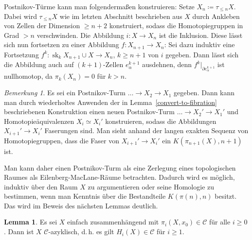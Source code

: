 \documentclass[11pt, a4paper, german]{article}
\theoremstyle{definition}
\newtheorem{lem}{Lemma}
\theoremstyle{remark}
\newtheorem*{bem}{Bemerkung}
\newcommand{\SC}{\mathcal{C}} %
\newcommand{\trunc}[2]{\tau_{#1} #2} %
\DeclareMathOperator{\sk}{sk} %
\renewcommand{\dh}{d.\,h.} %
\begin{document}
Postnikov-Türme kann man folgendermaßen konstruieren:
Setze $X_n \coloneqq \trunc{\leq n}{X}$.
Dabei wird $\trunc{\leq n}{X}$ wie im letzten Abschnitt beschrieben aus $X$ durch Ankleben von Zellen der Dimension $\geq n+2$ konstruiert, sodass die Homotopiegruppen in Grad $> n$ verschwinden.
Die Abbildung $i : X \to X_n$ ist die Inklusion.
Diese lässt sich nun fortsetzen zu einer Abbildung $f : X_{n+1} \to X_n$:
Sei dazu induktiv eine Fortsetzung $f^k : \sk_k X_{n+1} \cup X \to X_n$, $k \geq n+1$ von $i$ gegeben.
Dann lässt sich die Abbildung auch auf $(k{+}1)$-Zellen $e^{k+1}_\alpha$ ausdehnen, denn $f^k|_{\partial e^{k+1}_\alpha}$ ist nullhomotop, da $\pi_k(X_n) = 0$ für $k > n$.

\begin{bem}
  Es sei ein Postnikov-Turm $\ldots \to X_2 \to X_1$ gegeben.
  Dann kann man durch wiederholtes Anwenden der in Lemma~\ref{convert-to-fibration} beschriebenen Konstruktion einen neuen Postnikov-Turm $\ldots \to X_2' \to X_1'$ und Homotopieäquivalenzen $X_i \simeq X_i'$ konstruieren, sodass die Abbildungen $X_{i+1}' \to X_i'$ Faserungen sind.
  Man sieht anhand der langen exakten Sequenz von Homotopiegruppen, dass die Faser von $X_{i+1}' \to X_i'$ ein $K(\pi_{n+1}(X), n{+}1)$ ist.
\end{bem}

Man kann daher einen Postnikov-Turm als eine Zerlegung eines topologischen Raumes als Eilenberg-MacLane-Räume betrachten.
Dadurch wird es möglich, induktiv über den Raum $X$ zu argumentieren oder seine Homologie zu bestimmen, wenn man Kenntnis über die Bestandteile $K(\pi(n), n)$ besitzt.
Das wird im Beweis des nächsten Lemmas deutlich.

\begin{lem}\label{homotopy-in-c-implies-homology-in-c}
  Es sei $X$ einfach zusammenhängend mit $\pi_i(X, x_0) \in \SC$ für alle $i \geq 0$.
  Dann ist $X$ $\SC$-azyklisch, \dh{} es gilt $H_i(X) \in \SC$ für $i \geq 1$.
\end{lem}
\end{document}
